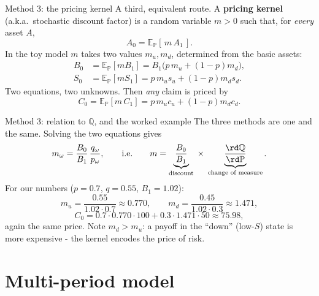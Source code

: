 \documentclass[pdf, handout]{beamer}
\begin{document}
\begin{frame}{Method 3: the pricing kernel}
A third, equivalent route. A \textbf{pricing kernel} (a.k.a.\ stochastic discount factor) is a random variable $m>0$ such that, for \emph{every} asset $A$,
\[
A_0=\mathbb{E}_{\mathbb{P}}[\,m\,A_1\,].
\]
In the toy model $m$ takes two values $m_u,m_d$, determined from the basic assets:
\begin{align*}
B_0&=\mathbb{E}_{\mathbb{P}}[m B_1]=B_1\big(p\,m_u+(1-p)m_d\big),\\
S_0&=\mathbb{E}_{\mathbb{P}}[m S_1]=p\,m_u s_u+(1-p)m_d s_d .
\end{align*}
Two equations, two unknowns. Then \emph{any} claim is priced by
\[
C_0=\mathbb{E}_{\mathbb{P}}[m\,C_1]=p\,m_u c_u+(1-p)m_d c_d .
\]
\end{frame}

\begin{frame}{Method 3: relation to $\mathbb{Q}$, and the worked example}
The three methods are one and the same. Solving the two equations gives
\[
m_\omega=\frac{B_0}{B_1}\,\frac{q_\omega}{p_\omega},
\qquad\text{i.e.}\qquad
m=\underbrace{\frac{B_0}{B_1}}_{\text{discount}}\;\times\;\underbrace{\frac{\rd\mathbb{Q}}{\rd\mathbb{P}}}_{\text{change of measure}} .
\]
For our numbers ($p=0.7$, $q=0.55$, $B_1=1.02$):
\[
m_u=\frac{0.55}{1.02\cdot0.7}\approx0.770,\qquad
m_d=\frac{0.45}{1.02\cdot0.3}\approx1.471,
\]
\[
C_0=0.7\cdot0.770\cdot100+0.3\cdot1.471\cdot50\approx 75.98 ,
\]
again the same price. Note $m_d>m_u$: a payoff in the ``down'' (low-$S$) state is more expensive - the kernel encodes the price of risk.
\end{frame}

\section{Multi-period model}
\end{document}
